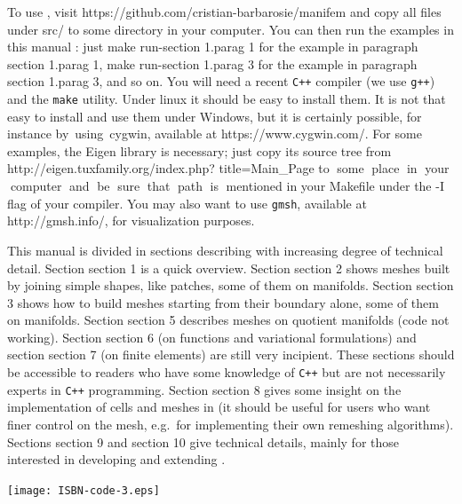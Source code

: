 To use \maniFEM, visit {\codett https://github.com/cristian-barbarosie/manifem}
and copy all files under {\codett src/} to some directory in your computer.
You can then run the examples in this manual : just {\codett make
run-\numb section 1.\numb parag 1}
for the example in paragraph \numb section 1.\numb parag 1,
{\codett make run-\numb section 1.\numb parag 3} for the example
in paragraph \numb section 1.\numb parag 3, and so on.
You will need a recent {\tt C++} compiler (we use {\tt g++}) and the {\tt make} utility.
Under linux it should be easy to install them.
It is not that easy to install and use them under Windows, but it is certainly possible,
for instance \hbox{by using {\codett cygwin}}, available at {\codett https://www.cygwin.com/}.
For some examples, the {\codett Eigen} library is necessary; just copy its source tree
from {\codett http://eigen.tuxfamily.org/index.php? title=Main\_Page}
to $\;$some $\;$place $\;$in $\;$your $\;$computer $\;$and $\;$be $\;$sure $\;$that
$\;$path $\;$is $\;$mentioned in your {\codett Makefile}
under the {\codett -I} flag of your compiler.
You may also want to use {\tt gmsh}, available at {\codett http://gmsh.info/},
for visualization purposes.

This manual is divided in sections describing {\maniFEM} with increasing degree of technical
detail.
Section \numb section 1 is a quick overview.
Section \numb section 2 shows meshes built by joining simple shapes, like patches,
some of them on manifolds.
Section \numb section 3 shows how to build meshes starting from their boundary alone,
some of them on manifolds.
Section \numb section 5 describes meshes on quotient manifolds (code not working).
Section \numb section 6 (on functions and variational formulations) and
section \numb section 7 (on finite elements) are still very incipient.
These sections should be accessible to readers who have some knowledge of {\tt C++}
but are not necessarily experts in {\tt C++} programming.
Section \numb section 8 gives some insight on the implementation of cells and meshes in
{\maniFEM} (it should be useful for users who want finer control on the mesh,
e.g.~for implementing their own remeshing algorithms).
Sections \numb section 9 and \numb section 10 give technical details, mainly for those
interested in developing and extending \maniFEM.
\vfil\eject\leavevmode\vglue 5cm

\texttt{[image: ISBN-code-3.eps]}
\hskip 10mm\raise 17mm\hbox{}

